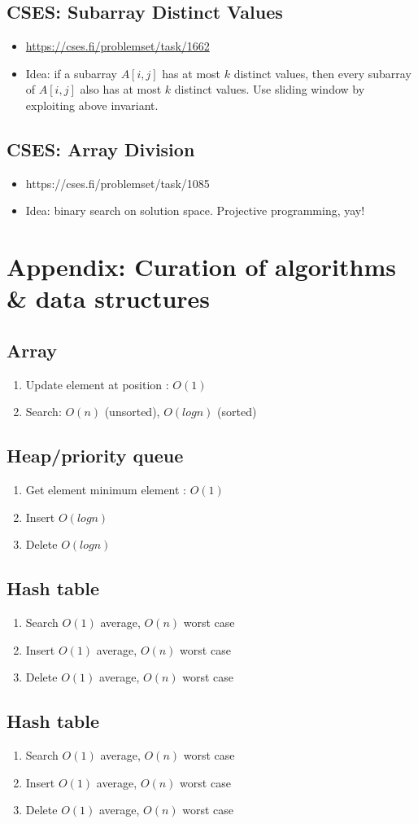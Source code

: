 \documentclass[titlepage, 12pt]{book}
\begin{document}
\section{CSES: Subarray Distinct Values}
\begin{itemize}
    \item\url{https://cses.fi/problemset/task/1662}
    \item Idea: if a subarray $A[i,j]$ has at most $k$ distinct values, then
        every subarray of $A[i, j]$ also has at most $k$ distinct values. Use
        sliding window by exploiting above invariant.
\end{itemize}
\section{CSES: Array Division}
\begin{itemize}
    \item https://cses.fi/problemset/task/1085
    \item Idea: binary search on solution space. Projective programming, yay!
\end{itemize}
\chapter{Appendix: Curation of algorithms \& data structures}
\section{Array}
\begin{enumerate}
    \item Update element at position : $O(1)$
    \item Search: $O(n)$ (unsorted), $O(logn)$ (sorted)
\end{enumerate}

\section{Heap/priority queue}
\begin{enumerate}
    \item Get element minimum element : $O(1)$
    \item Insert $O(logn)$
    \item Delete $O(logn)$
\end{enumerate}

\section{Hash table}
\begin{enumerate}
    \item Search $O(1)$ average, $O(n)$ worst case
    \item Insert $O(1)$ average, $O(n)$ worst case
    \item Delete $O(1)$ average, $O(n)$ worst case
\end{enumerate}

\section{Hash table}
\begin{enumerate}
    \item Search $O(1)$ average, $O(n)$ worst case
    \item Insert $O(1)$ average, $O(n)$ worst case
    \item Delete $O(1)$ average, $O(n)$ worst case
\end{enumerate}
\end{document}
